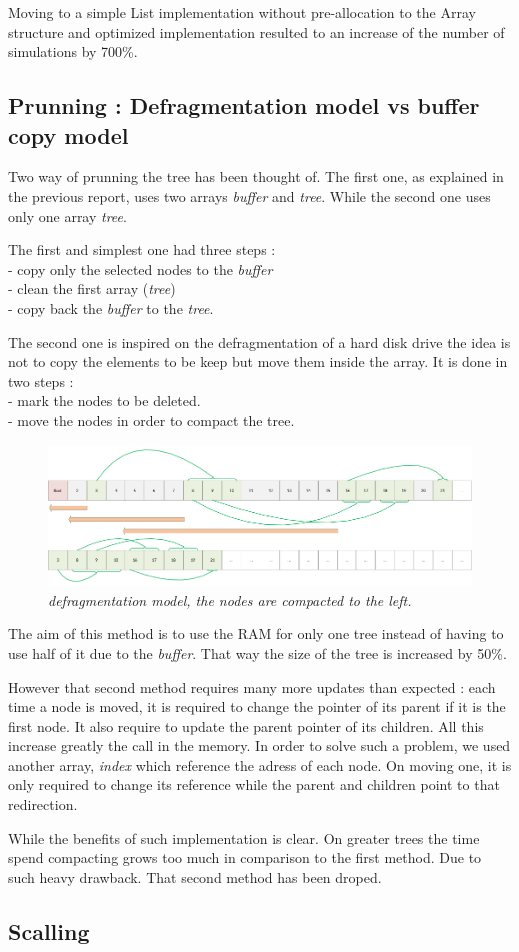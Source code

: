 Moving to a simple List implementation without pre-allocation to the Array structure and optimized implementation resulted to an increase of the number of simulations by 700\%.

\subsection{Prunning : Defragmentation model vs buffer copy model}

Two way of prunning the tree has been thought of. The first one, as  explained in the previous report, uses two arrays \textit{buffer} and \textit{tree}. While the second one uses only one array \textit{tree}.

The first and simplest one had three steps : \\
- copy only the selected nodes to the \textit{buffer} \\
- clean the first array (\textit{tree}) \\
- copy back the \textit{buffer} to the \textit{tree}.

The second one is inspired on the defragmentation of a hard disk drive the idea is not to copy the elements to be keep but move them inside the array. It is done in two steps : \\
- mark the nodes to be deleted. \\
- move the nodes in order to compact the tree. \\


\begin{figure}[H] 
\centerline{\includegraphics[width=\textwidth]{Optimisations/array.png}}
\caption{\label{fig:Defrag}\textit{defragmentation model, the nodes are compacted to the left.}}
\end{figure}

The aim of this method is to use the RAM for only one tree instead of having to use half of it due to the \textit{buffer}. That way the size of the tree is increased by 50\%.

However that second method requires many more updates than expected : 
each time a node is moved, it is required to change the pointer of its parent if it is the first node. It also require to update the parent pointer of its children. All this increase greatly the call in the memory. In order to solve such a problem, we used another array, \textit{index} which reference the adress of each node. On moving one, it is only required to change its reference while the parent and children point to that redirection.

While the benefits of such implementation is clear. On greater trees the time spend compacting grows too much in comparison to the first method. Due to such heavy drawback. That second method has been droped.

\subsection{Scalling}


